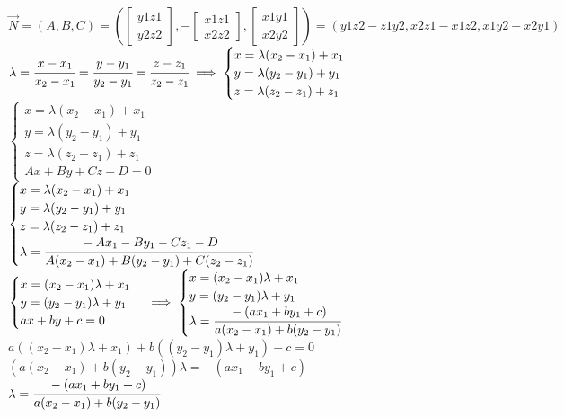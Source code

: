 \documentclass[12pt]{article} %
\begin{document}
    \hspace*{-4cm}$\overrightarrow{N} = (A, B, C) = \left(\begin{bmatrix}
    y1 z1\\ y2 z2
    \end{bmatrix},-\begin{bmatrix}
    x1 z1\\ x2 z2
    \end{bmatrix},\begin{bmatrix}
    x1 y1\\ x2 y2
    \end{bmatrix}\right)= \left(y1z2 - z1y2, x2z1 - x1z2, x1y2 - x2y1\right)$\\
    $ \lambda = \cfrac{x - x_1}{x_2 - x_1} = \cfrac{y - y_1}{y_2 - y_1} = \cfrac{z - z_1}{z_2 - z_1} \implies \begin{cases}
    x = \lambda (x_2 - x_1) + x_1\\
    y = \lambda (y_2 - y_1) + y_1\\
    z = \lambda (z_2 - z_1) + z_1
    \end{cases}$\\ \newpage
	\hspace{-1cm}$\begin{cases}
	x = \lambda (x_2 - x_1) + x_1\\
	y = \lambda (y_2 - y_1) + y_1\\
	z = \lambda (z_2 - z_1) + z_1\\
	Ax + By + Cz + D = 0
	\end{cases}$\\
	$\begin{cases}
	x = \lambda (x_2 - x_1) + x_1\\
	y = \lambda (y_2 - y_1) + y_1\\
	z = \lambda (z_2 - z_1) + z_1\\
	\lambda = \cfrac{-Ax_1 - By_1 - Cz_1 - D}{A(x_2 - x_1) + B(y_2 - y_1) + C(z_2 - z_1)}
	\end{cases}$\\
	$ \begin{cases}
	x= (x_2 - x_1) \lambda + x_1\\
	y = (y_2 - y_1 ) \lambda + y_1\\
	ax + by + c = 0
	\end{cases} \implies \begin{cases}
	x= (x_2 - x_1) \lambda + x_1\\
	y = (y_2 - y_1 ) \lambda + y_1\\
	\lambda = \cfrac{-( ax_1 + by_1 + c)}{a(x_2 - x_1)  + b(y_2 - y_1 )}
	\end{cases}$\\
	$a((x_2 - x_1) \lambda + x_1) + b((y_2 - y_1 ) \lambda + y_1) + c = 0$\\
	$(a(x_2 - x_1)  + b(y_2 - y_1 )) \lambda = -( ax_1 + by_1 + c)$\\
	$\lambda = \cfrac{-( ax_1 + by_1 + c)}{a(x_2 - x_1)  + b(y_2 - y_1 )}$
 
\end{document}
